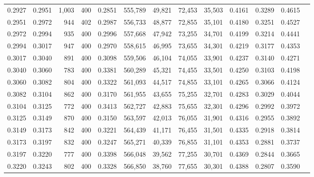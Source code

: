 \begin{tabular}{rrrrrrrrrrrrr}
0.2927 & 0.2951 &  1,003 & 400 &                                     0.2851 & 555,789 &  49,821 &  72,453 &  35,503 & 0.4161 & 0.3289 & 0.4615 \\
0.2951 & 0.2972 &    944 & 402 &                                     0.2987 & 556,733 &  48,877 &  72,855 &  35,101 & 0.4180 & 0.3251 & 0.4527 \\
0.2972 & 0.2994 &    935 & 400 &                                     0.2996 & 557,668 &  47,942 &  73,255 &  34,701 & 0.4199 & 0.3214 & 0.4441 \\
0.2994 & 0.3017 &    947 & 400 &                                     0.2970 & 558,615 &  46,995 &  73,655 &  34,301 & 0.4219 & 0.3177 & 0.4353 \\
0.3017 & 0.3040 &    891 & 400 &                                     0.3098 & 559,506 &  46,104 &  74,055 &  33,901 & 0.4237 & 0.3140 & 0.4271 \\
0.3040 & 0.3060 &    783 & 400 &                                     0.3381 & 560,289 &  45,321 &  74,455 &  33,501 & 0.4250 & 0.3103 & 0.4198 \\
0.3060 & 0.3082 &    804 & 400 &                                     0.3322 & 561,093 &  44,517 &  74,855 &  33,101 & 0.4265 & 0.3066 & 0.4124 \\
0.3082 & 0.3104 &    862 & 400 &                                     0.3170 & 561,955 &  43,655 &  75,255 &  32,701 & 0.4283 & 0.3029 & 0.4044 \\
0.3104 & 0.3125 &    772 & 400 &                                     0.3413 & 562,727 &  42,883 &  75,655 &  32,301 & 0.4296 & 0.2992 & 0.3972 \\
0.3125 & 0.3149 &    870 & 400 &                                     0.3150 & 563,597 &  42,013 &  76,055 &  31,901 & 0.4316 & 0.2955 & 0.3892 \\
0.3149 & 0.3173 &    842 & 400 &                                     0.3221 & 564,439 &  41,171 &  76,455 &  31,501 & 0.4335 & 0.2918 & 0.3814 \\
0.3173 & 0.3197 &    832 & 400 &                                     0.3247 & 565,271 &  40,339 &  76,855 &  31,101 & 0.4353 & 0.2881 & 0.3737 \\
0.3197 & 0.3220 &    777 & 400 &                                     0.3398 & 566,048 &  39,562 &  77,255 &  30,701 & 0.4369 & 0.2844 & 0.3665 \\
0.3220 & 0.3243 &    802 & 400 &                                     0.3328 & 566,850 &  38,760 &  77,655 &  30,301 & 0.4388 & 0.2807 & 0.3590 \\

\end{tabular}
